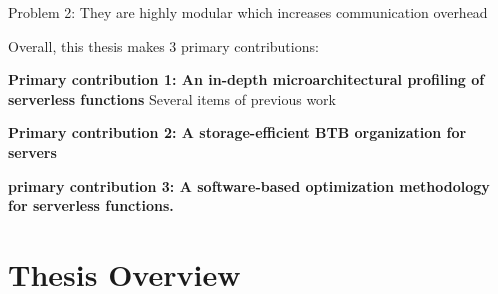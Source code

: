\documentclass[../main.tex]{subfiles}
\begin{document}
\begin{refsection}
Problem 2: They are highly modular which increases communication overhead

Overall, this thesis makes 3 primary contributions:

\vspace*{0.5cm}

\noindent
\textbf{Primary contribution 1: An in-depth microarchitectural profiling of serverless functions}
Several items of previous work

\vspace*{0.5cm}

\noindent
\textbf{Primary contribution 2: A storage-efficient BTB organization for servers}

\vspace*{0.5cm}

\noindent
\textbf{primary contribution 3: A software-based optimization methodology for serverless functions.}

\section{Thesis Overview}


\ifx\chapincluded\undefined
  \printbibliography
  \end{refsection}
 \fi
\end{document}
